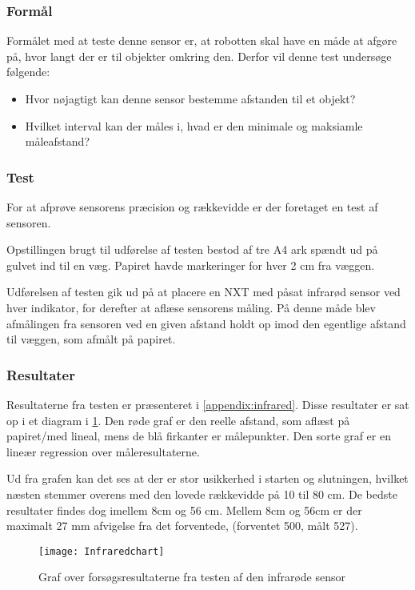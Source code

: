 \subsubsection{Formål}
Formålet med at teste denne sensor er, at robotten skal have en måde at afgøre på, hvor langt der er til objekter omkring den.
Derfor vil denne test undersøge følgende:
\begin{itemize}
\item Hvor nøjagtigt kan denne sensor bestemme afstanden til et objekt?
\item Hvilket interval kan der måles i, hvad er den minimale og maksiamle måleafstand?
\end{itemize}

\subsubsection{Test}
For at afprøve sensorens præcision og rækkevidde er der foretaget en test af sensoren.

Opstillingen brugt til udførelse af testen bestod af tre A4 ark spændt ud på gulvet ind til en væg. 
Papiret havde markeringer for hver 2 cm fra væggen.

Udførelsen af testen gik ud på at placere en NXT med påsat infrarød sensor ved hver indikator, for derefter at aflæse sensorens måling.
På denne måde blev afmålingen fra sensoren ved en given afstand holdt op imod den egentlige afstand til væggen, som afmålt på papiret.

\subsubsection{Resultater}

Resultaterne fra testen er præsenteret i \cref{appendix:infrared}. 
Disse resultater er sat op i et diagram i \cref{sensor:infrared_chart}.
Den røde graf er den reelle afstand, som aflæst på papiret/med lineal, mens de blå firkanter er målepunkter.
Den sorte graf er en lineær regression over måleresultaterne.

Ud fra grafen kan det ses at der er stor usikkerhed i starten og slutningen, hvilket næsten stemmer overens med den lovede rækkevidde på 10 til 80 cm.
De bedste resultater findes dog imellem 8cm og 56 cm. 
Mellem 8cm og 56cm er der maximalt 27 mm afvigelse fra det forventede, (forventet 500, målt 527).

\begin{figure}[h]
\texttt{[image: Infraredchart]}
\caption{Graf over forsøgsresultaterne fra testen af den infrarøde sensor}
\label{sensor:infrared_chart}
\end{figure}

